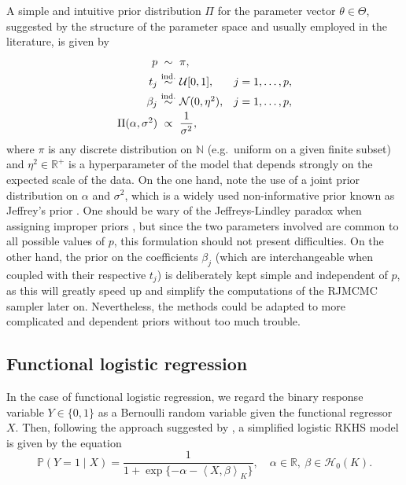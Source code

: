 \documentclass{article}
\numberwithin{equation}{section}
\theoremstyle{plain}
\theoremstyle{definition}
\newcommand{\N}{\mathbb{N}}
\newcommand{\R}{\mathbb{R}}
\newcommand{\Hcal}{\mathcal{H}}
\newcommand\dotprod[2]{\left\langle#1,#2\right\rangle}
\newcommand{\textoversim}[1]{\overset{\text{#1}}{\sim}}
\begin{document}
A simple and intuitive prior distribution \(\Pi\) for the parameter vector \(\theta \in \Theta\), suggested by the structure of the parameter space and usually employed in the literature, is given by
\begin{equation}\label{eq:prior-linear}
  \begin{array}{r@{\ }c@{\ }l@{\quad}l}
    p                    & \sim               & \pi,                   &                \\[0.3em]
    t_j                  & \textoversim{ind.} & \mathcal{U}[0,1],      & j = 1,\dots,p, \\[0.3em]
    \beta_j              & \textoversim{ind.} & \mathcal{N}(0,\eta^2), & j = 1,\dots,p, \\[0.3em]
    \Pi(\alpha,\sigma^2) & \propto            & \dfrac{1}{\sigma^2},   &
  \end{array}
\end{equation}
where  \(\pi\) is any discrete distribution on \(\N\) (e.g.~uniform on a given finite subset) and \(\eta^2 \in \R^+\) is a hyperparameter of the model that depends strongly on the expected scale of the data. On the one hand, note the use of a joint prior distribution on \(\alpha\) and \(\sigma^2\), which is a widely used non-informative prior known as Jeffrey's prior \citep{jeffreys1946invariant}. One should be wary of the Jeffreys-Lindley paradox when assigning improper priors \citep[see][]{robert2014jeffreys}, but since the two parameters involved are common to all possible values of \(p\), this formulation should not present difficulties. On the other hand, the prior on the coefficients \(\beta_j\) (which are interchangeable when coupled with their respective \(t_j\)) is deliberately kept simple and independent of \(p\), as this will greatly speed up and simplify the computations of the RJMCMC sampler later on. Nevertheless, the methods could be adapted to more complicated and dependent priors without too much trouble.

\subsection{Functional logistic regression}\label{sec:rkhs-logistic-model}

In the case of functional logistic regression, we regard the binary response variable \(Y\in\{0, 1\}\) as a Bernoulli random variable given the functional regressor \(X\). Then, following the approach suggested by \citet{berrendero2023functional}, a simplified logistic RKHS model is given by the equation
\begin{equation}\label{eq:rkhs-model-logistic}
  \mathbb P(Y=1 \mid X) = \frac{1}{1 + \exp\{-\alpha - \dotprod{X}{\beta}_K\}}, \quad \alpha \in \R, \ \beta \in \Hcal_{0}(K).
\end{equation}
\end{document}
